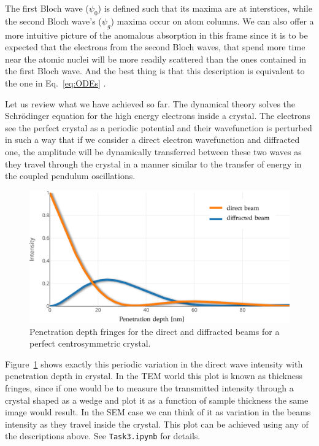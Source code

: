  The first Bloch wave ($\psi_0$) is defined such that its maxima are at interstices, while the second Bloch wave's ($\psi_g$) maxima occur on atom columns. We can also offer a more intuitive picture of the anomalous absorption in this frame since it is to be expected that the electrons from the second Bloch waves, that spend more time near the atomic nuclei will be more readily scattered than the ones contained in the first Bloch wave. And the best thing is that this description is equivalent to the one in Eq.~\ref{eq:ODEs} \cite{electronMicroscopy}.






Let us review what we have achieved so far. The dynamical theory solves the Schr\"{o}dinger equation for the high energy electrons inside a crystal. The electrons see the perfect crystal as a periodic potential and their wavefunction is perturbed in such a way that if we consider a direct electron wavefunction and  diffracted one, the amplitude will be dynamically transferred between these two waves as they travel through the crystal in a manner similar to the transfer of energy in the coupled pendulum oscillations.

\begin{figure}[ht]
    \centering
\includegraphics[width=0.82\linewidth]{Figures/fringes.png}
\caption[Thickness fringes.]{Penetration depth fringes for the direct and diffracted beams for a perfect centrosymmetric crystal.}
\label{Fig:fringes}

\end{figure}


Figure~\ref{Fig:fringes} shows exactly this periodic variation in the direct wave intensity  with penetration depth in crystal. In the TEM world this plot is known as thickness fringes, since if one would be to measure the transmitted intensity through a crystal shaped as a wedge and plot it as a function of sample thickness the same image would result. In the SEM case we can think of it as variation in the beams intensity as they travel inside the crystal. This plot can be achieved using any of the descriptions above. See \texttt{Task3.ipynb} for details.

